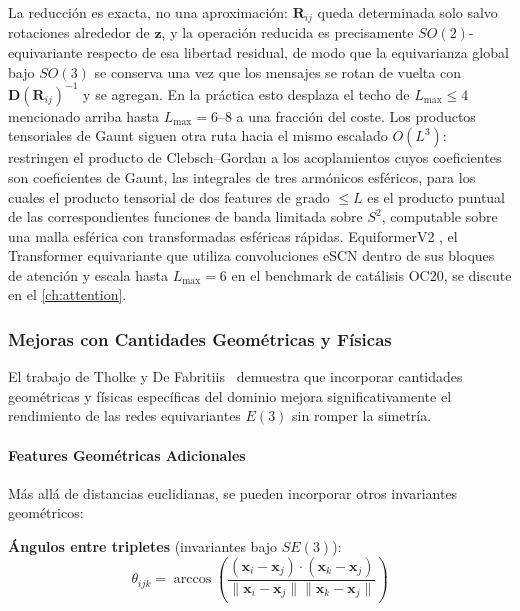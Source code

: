 La reducción es exacta, no una aproximación: $\mathbf{R}_{ij}$ queda determinada solo salvo rotaciones alrededor de $\hat{\mathbf{z}}$, y la operación reducida es precisamente $SO(2)$-equivariante respecto de esa libertad residual, de modo que la equivarianza global bajo $SO(3)$ se conserva una vez que los mensajes se rotan de vuelta con $\mathbf{D}(\mathbf{R}_{ij})^{-1}$ y se agregan. En la práctica esto desplaza el techo de $L_{\max} \le 4$ mencionado arriba hasta $L_{\max} = 6$--$8$ a una fracción del coste. Los productos tensoriales de Gaunt \citep{luo2024gaunt} siguen otra ruta hacia el mismo escalado $O(L^3)$: restringen el producto de Clebsch--Gordan a los acoplamientos cuyos coeficientes son coeficientes de Gaunt, las integrales de tres armónicos esféricos, para los cuales el producto tensorial de dos features de grado $\le L$ es el producto puntual de las correspondientes funciones de banda limitada sobre $S^2$, computable sobre una malla esférica con transformadas esféricas rápidas. EquiformerV2 \citep{liao2024equiformerv2}, el \gls{Transformer} equivariante que utiliza convoluciones eSCN dentro de sus bloques de atención y escala hasta $L_{\max} = 6$ en el benchmark de catálisis OC20, se discute en el \autoref{ch:attention}.

\subsubsection{Mejoras con Cantidades Geométricas y Físicas}

El trabajo de Tholke y De Fabritiis~\citep{tholke2022geometric} demuestra que incorporar cantidades geométricas y físicas específicas del dominio mejora significativamente el rendimiento de las redes equivariantes $E(3)$ sin romper la simetría.

\paragraph{Features Geométricas Adicionales}

Más allá de distancias euclidianas, se pueden incorporar otros invariantes geométricos:

\textbf{Ángulos entre tripletes} (invariantes bajo $SE(3)$):
\begin{equation}
\theta_{ijk} = \arccos\left(\frac{(\mathbf{x}_i - \mathbf{x}_j) \cdot (\mathbf{x}_k - \mathbf{x}_j)}{\|\mathbf{x}_i - \mathbf{x}_j\| \|\mathbf{x}_k - \mathbf{x}_j\|}\right)
\end{equation}

